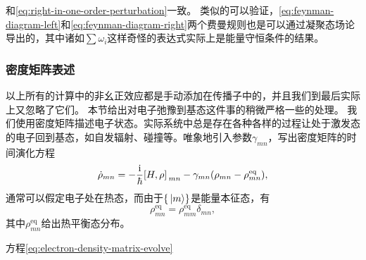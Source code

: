 和\eqref{eq:right-in-one-order-perturbation}一致。
类似的可以验证，\eqref{eq:feynman-diagram-left}和\eqref{eq:feynman-diagram-right}两个费曼规则也是可以通过凝聚态场论导出的，其中诸如$\sum \omega_i$这样奇怪的表达式实际上是能量守恒条件的结果。

\subsubsection{密度矩阵表述}\label{sec:electron-density-matrix}

以上所有的计算中的非幺正效应都是手动添加在传播子中的，并且我们到最后实际上又忽略了它们。
本节给出对电子弛豫到基态这件事的稍微严格一些的处理。
我们使用密度矩阵描述电子状态。实际系统中总是存在各种各样的过程让处于激发态的电子回到基态，如自发辐射、碰撞等。唯象地引入参数$\gamma_{mn}$，写出密度矩阵的时间演化方程
\begin{equation}
    \dot{\rho}_{mn} = - \frac{\ii}{\hbar} \comm*{H}{\rho}_{mn} - \gamma_{mn} (\rho_{mn} - \rho^\text{eq}_{mn}),
    \label{eq:electron-density-matrix-evolve}
\end{equation}
通常可以假定电子处在热态，而由于$\{\ket*{m}\}$是能量本征态，有
\begin{equation}
    \rho^\text{eq}_{mn} = \rho^\text{eq}_{mm} \delta_{mn},
\end{equation}
其中$\rho^\text{eq}_{mn}$给出热平衡态分布。

方程\eqref{eq:electron-density-matrix-evolve}

